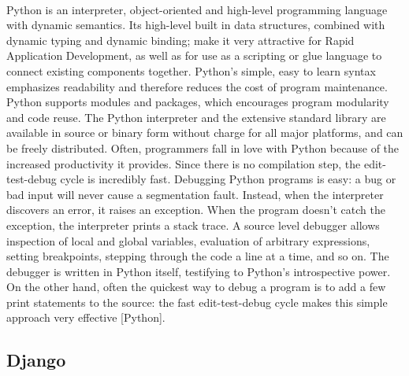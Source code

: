 \documentclass[12pt,a4paper,class,twoside,openany]{report}
\begin{document}
 \paragraph*{\hspace{.9 cm} }Python is an interpreter, object-oriented and high-level programming language with dynamic semantics. Its high-level built in data structures, combined with dynamic typing and dynamic binding; make it very attractive for Rapid Application Development, as well as for use as a scripting or glue language to connect existing components together. Python's simple, easy to learn syntax emphasizes readability and therefore reduces the cost of program maintenance. Python supports modules and packages, which encourages program modularity and code reuse. The Python interpreter and the extensive standard library are available in source or binary form without charge for all major platforms, and can be freely distributed.
 Often, programmers fall in love with Python because of the increased productivity it provides. Since there is no compilation step, the edit-test-debug cycle is incredibly fast. Debugging Python programs is easy: a bug or bad input will never cause a segmentation fault. Instead, when the interpreter discovers an error, it raises an exception. When the program doesn't catch the exception, the interpreter prints a stack trace. A source level debugger allows inspection of local and global variables, evaluation of arbitrary expressions, setting breakpoints, stepping through the code a line at a time, and so on. The debugger is written in Python itself, testifying to Python's introspective power. On the other hand, often the quickest way to debug a program is to add a few print statements to the source: the fast edit-test-debug cycle makes this simple approach very effective [Python].
\subsection{Django} 
\end{document}
